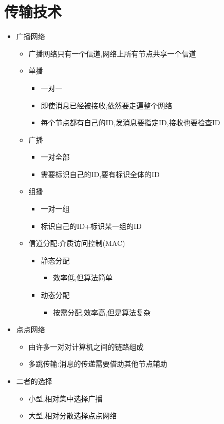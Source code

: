 \documentclass[a4paper,12pt,notitlepage]{article}
\begin{document}
\section{传输技术}
\begin{itemize}
	\item 广播网络
	\begin{itemize}
		\item 广播网络只有一个信道,网络上所有节点共享一个信道
		\item 单播
		\begin{itemize}
			\item 一对一
			\item 即使消息已经被接收,依然要走遍整个网络
			\item 每个节点都有自己的ID,发消息要指定ID,接收也要检查ID
		\end{itemize}
		\item 广播
		\begin{itemize}
			\item 一对全部
			\item 需要标识自己的ID,要有标识全体的ID
		\end{itemize}
		\item 组播
		\begin{itemize}
			\item 一对一组
			\item 标识自己的ID+标识某一组的ID
		\end{itemize}
		\item 信道分配:介质访问控制(MAC)
		\begin{itemize}
			\item 静态分配
			\begin{itemize}
				\item 效率低,但算法简单
			\end{itemize}
			\item 动态分配
			\begin{itemize}
				\item 按需分配,效率高,但是算法复杂
			\end{itemize}
		\end{itemize}
	\end{itemize}
	\item 点点网络
	\begin{itemize}
		\item 由许多一对对计算机之间的链路组成
		\item 多跳传输:消息的传递需要借助其他节点辅助
	\end{itemize}
	\item 二者的选择
	\begin{itemize}
		\item 小型,相对集中选择广播
		\item 大型,相对分散选择点点网络
	\end{itemize}
\end{itemize}
\end{document}
